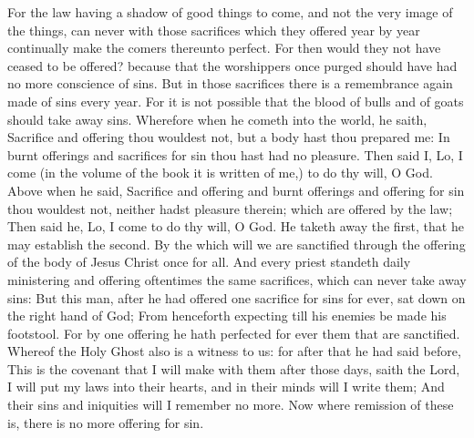  For the law having a shadow of good things to come, and not
the very image of the things, can never with those sacrifices which they
offered year by year continually make the comers thereunto perfect.
 For then would they not have ceased to be offered? because
that the worshippers once purged should have had no more conscience of
sins.  But in those sacrifices there is a remembrance again
made of sins every year.  For it is not possible that the
blood of bulls and of goats should take away sins. 
Wherefore when he cometh into the world, he saith, Sacrifice and
offering thou wouldest not, but a body hast thou prepared me:
 In burnt offerings and sacrifices for sin thou hast had no
pleasure.  Then said I, Lo, I come (in the volume of the
book it is written of me,) to do thy will, O God.  Above
when he said, Sacrifice and offering and burnt offerings and offering
for sin thou wouldest not, neither hadst pleasure therein; which are
offered by the law;  Then said he, Lo, I come to do thy
will, O God. He taketh away the first, that he may establish the second.
 By the which will we are sanctified through the offering
of the body of Jesus Christ once for all.  And every priest
standeth daily ministering and offering oftentimes the same sacrifices,
which can never take away sins:  But this man, after he had
offered one sacrifice for sins for ever, sat down on the right hand of
God;  From henceforth expecting till his enemies be made
his footstool.  For by one offering he hath perfected for
ever them that are sanctified.  Whereof the Holy Ghost also
is a witness to us: for after that he had said before, 
This is the covenant that I will make with them after those days, saith
the Lord, I will put my laws into their hearts, and in their minds will
I write them;  And their sins and iniquities will I
remember no more.  Now where remission of these is, there
is no more offering for sin.

